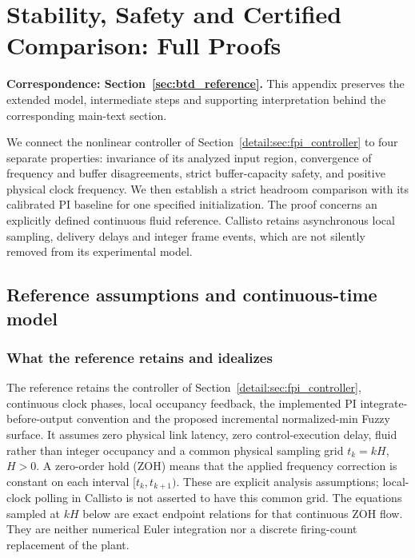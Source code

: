 \section{Stability, Safety and Certified Comparison: Full Proofs}
\label{app:theory}
\noindent\textbf{Correspondence: Section~\ref{sec:btd_reference}.} This appendix preserves the extended model, intermediate steps and supporting interpretation behind the corresponding main-text section.


\label{detail:sec:btd_reference}

We connect the nonlinear controller of Section~\ref{detail:sec:fpi_controller}
to four separate properties: invariance of its analyzed input region,
convergence of frequency and buffer disagreements, strict buffer-capacity
safety, and positive physical clock frequency. We then establish a
strict headroom comparison with its calibrated PI baseline for one
specified initialization. The proof concerns an explicitly defined
continuous fluid reference. Callisto retains asynchronous local
sampling, delivery delays and integer frame events, which are not
silently removed from its experimental model.

\subsection{Reference assumptions and continuous-time model}
\label{detail:subsec:btd_ref_model}

\subsubsection{What the reference retains and idealizes}
The reference retains the controller of Section~\ref{detail:sec:fpi_controller}, continuous clock phases, local occupancy
feedback, the implemented PI integrate-before-output convention and the proposed
incremental normalized-min Fuzzy surface. It assumes zero physical link latency,
zero control-execution delay, fluid rather than integer occupancy and a
common physical sampling grid $t_k=kH$, $H>0$. A zero-order hold (ZOH)
means that the applied frequency correction is constant on each interval
$[t_k,t_{k+1})$. These are explicit analysis assumptions; local-clock
polling in Callisto is not asserted to have this common grid.
The equations sampled at $kH$ below are exact endpoint relations for that
continuous ZOH flow. They are neither numerical Euler integration nor a
discrete firing-count replacement of the plant.

